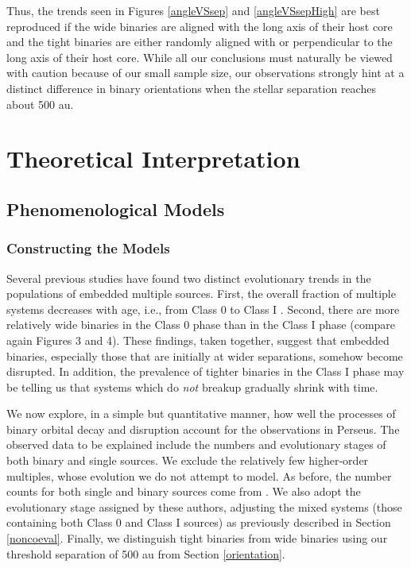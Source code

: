 \documentclass[usenatbib,a4paper]{mnras}
\begin{document}
Thus, the trends seen in Figures \ref{angleVSsep} and \ref{angleVSsepHigh} are best reproduced if the wide binaries are aligned with the long axis of their host core and the tight binaries are either randomly aligned with or perpendicular to the long axis of their host core.  While all our conclusions must naturally be viewed with caution because of our small sample size, our observations strongly hint at a distinct difference in binary orientations when the stellar separation reaches about 500 au. 

\section{Theoretical Interpretation}\label{theory}

\subsection{Phenomenological Models}\label{models}

\subsubsection{Constructing the Models}

Several previous studies have found two distinct evolutionary trends in the populations of embedded multiple sources.  First, the overall fraction of multiple systems decreases with age, i.e., from Class 0 to Class I \citep{Looney00, Chen13, Tobin16}.  Second, there are more relatively wide binaries in the Class 0 phase than in the Class I phase (compare again Figures 3 and 4).   These findings, taken together, suggest that embedded binaries, especially those that are initially at wider separations, somehow become disrupted.  In addition, the prevalence of tighter binaries in the Class I phase may be telling us that systems which do \emph{not} breakup gradually shrink with time.

We now explore, in a simple but quantitative manner, how well the processes of binary orbital decay and disruption account for the observations in Perseus.  The observed data to be explained include the numbers and evolutionary stages of both binary and single sources.  We exclude the relatively few higher-order multiples, whose evolution we do not attempt to model.  As before, the number counts for both single and binary sources come from \citet{Tobin16}.  We also adopt the evolutionary stage assigned by these authors, adjusting the mixed systems (those containing both Class 0 and Class I sources) as previously described in Section \ref{noncoeval}.  Finally, we distinguish tight binaries from wide binaries using our threshold separation of 500 au from Section \ref{orientation}. 
\end{document}
